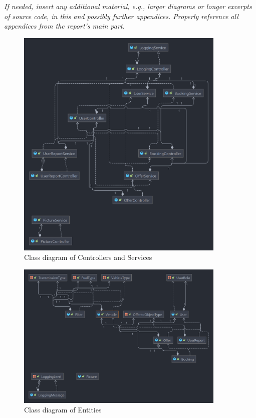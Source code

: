 \emph{If needed, insert any additional material, e.g., larger diagrams or longer excerpts of source code, in this and possibly further appendices. Properly reference all appendices from the report's main part.}

\begin{figure}[h]
	\centering
	\includegraphics[width=10cm]{resources/images/class diagrams/class-diagram_controller-services.png}
	\caption{Class diagram of Controllers and Services}
	\label{fig:cd:controller-services}
\end{figure}

\begin{figure}[h]
	\centering
	\includegraphics[width=10cm]{resources/images/class diagrams/class-diagram_entities.png}
	\caption{Class diagram of Entities}
	\label{fig:cd:entities}
\end{figure}

